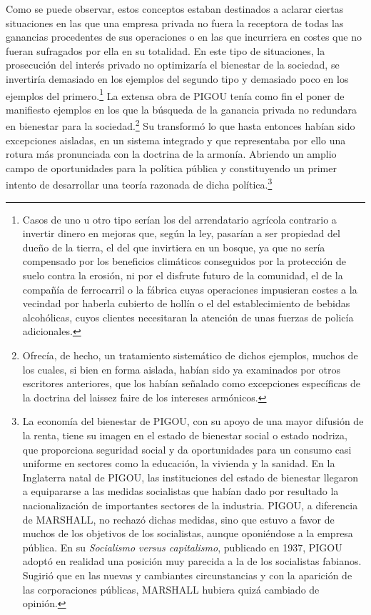 \documentclass[10pt,a4paper]{article}
\begin{document}
Como se puede observar, estos conceptos estaban destinados a aclarar ciertas situaciones en las que una empresa privada no fuera la receptora de todas las ganancias procedentes de sus operaciones o en las que incurriera en costes que no fueran sufragados por ella en su totalidad. En este tipo de situaciones, la prosecución del interés privado no optimizaría el bienestar de la sociedad, se invertiría demasiado en los ejemplos del segundo tipo y demasiado poco en los ejemplos del primero.\footnote{%
    Casos de uno u otro tipo serían los del arrendatario agrícola contrario a invertir dinero en mejoras que, según la ley, pasarían a ser propiedad del dueño de la tierra, el del que invirtiera en un bosque, ya que no sería compensado por los beneficios climáticos conseguidos por la protección de suelo contra la erosión, ni por el disfrute futuro de la comunidad, el de la compañía de ferrocarril o la fábrica cuyas operaciones impusieran costes a la vecindad por haberla cubierto de hollín o el del establecimiento de bebidas alcohólicas, cuyos clientes necesitaran la atención de unas fuerzas de policía adicionales.
} La extensa obra de PIGOU tenía como fin el poner de manifiesto ejemplos en los que la búsqueda de la ganancia privada no redundara en bienestar para la sociedad.\footnote{%
    Ofrecía, de hecho, un tratamiento sistemático de dichos ejemplos, muchos de los cuales, si bien en forma aislada, habían sido ya examinados por otros escritores anteriores, que los habían señalado como excepciones específicas de la doctrina del laissez faire de los intereses armónicos.
} Su transformó lo que hasta entonces habían sido excepciones aisladas, en un sistema integrado y que representaba por ello una rotura más pronunciada con la doctrina de la armonía. Abriendo un amplio campo de oportunidades para la política pública y constituyendo un primer intento de desarrollar una teoría razonada de dicha política.\footnote{%
    La economía del bienestar de PIGOU, con su apoyo de una mayor difusión de la renta, tiene su imagen en el estado de bienestar social o estado nodriza, que proporciona seguridad social y da oportunidades para un consumo casi uniforme en sectores como la educación, la vivienda y la sanidad. En la Inglaterra natal de PIGOU, las instituciones del estado de bienestar llegaron a equipararse a las medidas socialistas que habían dado por resultado la nacionalización de importantes sectores de la industria. PIGOU, a diferencia de MARSHALL, no rechazó dichas medidas, sino que estuvo a favor de muchos de los objetivos de los socialistas, aunque oponiéndose a la empresa pública. En su \textit{Socialismo versus capitalismo}, publicado en 1937, PIGOU adoptó en realidad una posición muy parecida a la de los socialistas fabianos. Sugirió que en las nuevas y cambiantes circunstancias y con la aparición de las corporaciones públicas, MARSHALL hubiera quizá cambiado de opinión.
}
\end{document}

